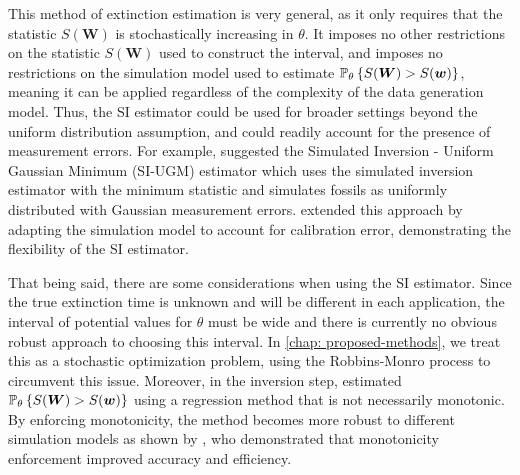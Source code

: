 This method of extinction estimation is very general, as it only requires that the statistic $S(\bm{W})$ is stochastically increasing in $\theta$. It imposes no other restrictions on the statistic $S(\bm{W})$ used to construct the interval, and imposes no restrictions on the simulation model used to estimate $\mathbb{P}_\theta\left\{S(\bm{W}) > S(\bm{w})\right\}$, meaning it can be applied regardless of the complexity of the data generation model. Thus, the SI estimator could be used for broader settings beyond the uniform distribution assumption, and could readily account for the presence of measurement errors. For example, \citet{Huang2019} suggested the Simulated Inversion - Uniform Gaussian Minimum (SI-UGM) estimator which uses the simulated inversion estimator with the minimum statistic and simulates fossils as uniformly distributed with Gaussian measurement errors. \citet{King2020} extended this approach by adapting the simulation model to account for calibration error, demonstrating the flexibility of the SI estimator.

That being said, there are some considerations when using the SI estimator. Since the true extinction time is unknown and will be different in each application, the interval of potential values for $\theta$ must be wide and there is currently no obvious robust approach to choosing this interval. In \autoref{chap: proposed-methods}, we treat this as a stochastic optimization problem, using the Robbins-Monro process to circumvent this issue. Moreover, in the inversion step, \citet{Huang2019} estimated $\mathbb{P}_\theta\left\{S(\bm{W}) > S(\bm{w})\right\}$ using a regression method that is not necessarily monotonic. By enforcing monotonicity, the method becomes more robust to different simulation models as shown by \citet{King2020}, who demonstrated that monotonicity enforcement improved accuracy and efficiency.